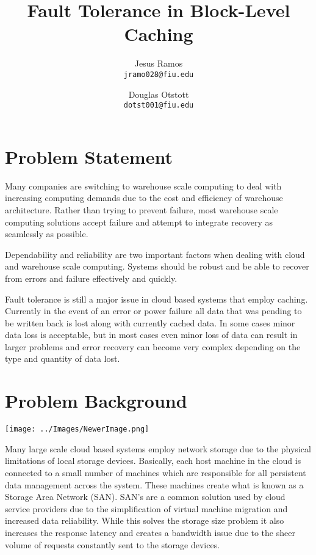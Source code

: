 \documentclass[letterpaper,12pt]{article}
\title{Fault Tolerance in Block-Level Caching}
\author{
  Jesus Ramos \\ \texttt{jramo028@fiu.edu} \and
  Douglas Otstott \\ \texttt{dotst001@fiu.edu}
}
\date{}
\begin{document}
\maketitle

\section*{Problem Statement}

Many companies are switching to warehouse scale computing to deal with
increasing computing demands due to the cost and efficiency of
warehouse architecture. Rather than trying to prevent failure, most
warehouse scale computing solutions accept failure and attempt to
integrate recovery as seamlessly as possible.

Dependability and reliability are two important factors when dealing
with cloud and warehouse scale computing. Systems should be robust and
be able to recover from errors and failure effectively and quickly.

Fault tolerance is still a major issue in cloud based systems that
employ caching. Currently in the event of an error or power failure
all data that was pending to be written back is lost along with
currently cached data. In some cases minor data loss is acceptable,
but in most cases even minor loss of data can result in larger
problems and error recovery can become very complex depending on the
type and quantity of data lost.


\section*{Problem Background}

\begin{center}
  \texttt{[image: ../Images/NewerImage.png]}
\end{center}

Many large scale cloud based systems employ network storage due to the
physical limitations of local storage devices. Basically, each host
machine in the cloud is connected to a small number of machines which
are responsible for all persistent data management across the system.
These machines create what is known as a Storage Area Network (SAN).
SAN's are a common solution used by cloud service providers due to the
simplification of virtual machine migration and increased data
reliability\cite{Datacenter}. While this solves the storage size
problem it also increases the response latency and creates a bandwidth
issue due to the sheer volume of requests constantly sent to the
storage devices.
\end{document}
